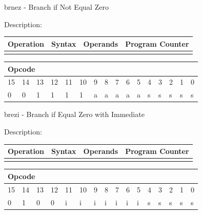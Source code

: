 \documentclass[%
	pdftex,
	a4paper,
	oneside,
	bibtotoc,%
	idxtotoc,%
	bibtotocnumbered,
	halfparskip,%
]{scrbook}
\begin{document}
\bigskip

brnez - Branch if Not Equal Zero

Description:

\begin{tabular}{|l|l|l|l|}
\hline
Operation & Syntax & Operands & Program Counter \\ \hline
&  &  &  \\ \hline
\end{tabular}

\begin{tabular}{|c|c|c|c|c|c|c|c|c|c|c|c|c|c|c|c|}
\hline
\multicolumn{6}{|l|}{Opcode} & \multicolumn{5}{|l|}{} & \multicolumn{5}{|l|}{
} \\ \hline
15 & 14 & 13 & 12 & 11 & 10 & 9 & 8 & 7 & 6 & 5 & 4 & 3 & 2 & 1 & 0 \\ \hline
\multicolumn{1}{|l|}{0} & \multicolumn{1}{|l|}{0} & \multicolumn{1}{|l|}{1}
& \multicolumn{1}{|l|}{1} & \multicolumn{1}{|l|}{1} & \multicolumn{1}{|l|}{1}
& \multicolumn{1}{|l|}{a} & \multicolumn{1}{|l|}{a} & \multicolumn{1}{|l|}{a}
& \multicolumn{1}{|l|}{a} & \multicolumn{1}{|l|}{a} & \multicolumn{1}{|l|}{s}
& \multicolumn{1}{|l|}{s} & \multicolumn{1}{|l|}{s} & \multicolumn{1}{|l|}{s}
& \multicolumn{1}{|l|}{s} \\ \hline
\end{tabular}

\bigskip

brezi - Branch if Equal Zero with Immediate

Description:

\begin{tabular}{|l|l|l|l|}
\hline
Operation & Syntax & Operands & Program Counter \\ \hline
&  &  &  \\ \hline
\end{tabular}

\begin{tabular}{|c|c|c|c|c|c|c|c|c|c|c|c|c|c|c|c|}
\hline
\multicolumn{6}{|l|}{Opcode} & \multicolumn{5}{|l|}{} & \multicolumn{5}{|l|}{
} \\ \hline
15 & 14 & 13 & 12 & 11 & 10 & 9 & 8 & 7 & 6 & 5 & 4 & 3 & 2 & 1 & 0 \\ \hline
\multicolumn{1}{|l|}{0} & \multicolumn{1}{|l|}{1} & \multicolumn{1}{|l|}{0}
& \multicolumn{1}{|l|}{0} & \multicolumn{1}{|l|}{i} & \multicolumn{1}{|l|}{i}
& \multicolumn{1}{|l|}{i} & \multicolumn{1}{|l|}{i} & \multicolumn{1}{|l|}{i}
& \multicolumn{1}{|l|}{i} & \multicolumn{1}{|l|}{i} & \multicolumn{1}{|l|}{s}
& \multicolumn{1}{|l|}{s} & \multicolumn{1}{|l|}{s} & \multicolumn{1}{|l|}{s}
& \multicolumn{1}{|l|}{s} \\ \hline
\end{tabular}
\end{document}
